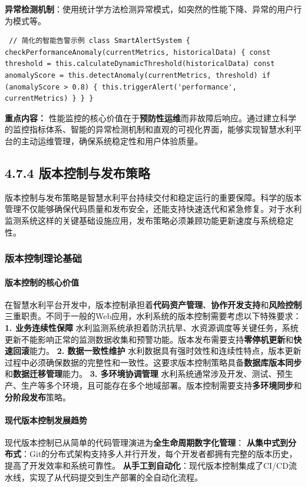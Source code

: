 \textbf{异常检测机制}：使用统计学方法检测异常模式，如突然的性能下降、异常的用户行为模式等。 \begin{verbatim} // 简化的智能告警示例 class SmartAlertSystem { checkPerformanceAnomaly(currentMetrics, historicalData) { const threshold = this.calculateDynamicThreshold(historicalData) const anomalyScore = this.detectAnomaly(currentMetrics, threshold) if (anomalyScore > 0.8) { this.triggerAlert('performance', currentMetrics) } } } \end{verbatim} \textbf{重点内容：} 性能监控的核心价值在于\textbf{预防性运维}而非故障后响应。通过建立科学的监控指标体系、智能的异常检测机制和直观的可视化界面，能够实现智慧水利平台的主动运维管理，确保系统稳定性和用户体验质量。 \subsection{4.7.4 版本控制与发布策略}\label{ux7248ux672cux63a7ux5236ux4e0eux53d1ux5e03ux7b56ux7565} 版本控制与发布策略是智慧水利平台持续交付和稳定运行的重要保障。科学的版本管理不仅能够确保代码质量和发布安全，还能支持快速迭代和紧急修复。对于水利监测系统这样的关键基础设施应用，发布策略必须兼顾功能更新速度与系统稳定性。 \subsubsection{版本控制理论基础}\label{ux7248ux672cux63a7ux5236ux7406ux8bbaux57faux7840} \paragraph{版本控制的核心价值}\label{ux7248ux672cux63a7ux5236ux7684ux6838ux5fc3ux4ef7ux503c} 在智慧水利平台开发中，版本控制承担着\textbf{代码资产管理}、\textbf{协作开发支持}和\textbf{风险控制}三重职责。不同于一般的Web应用，水利系统的版本控制需要考虑以下特殊要求： \textbf{1. 业务连续性保障} 水利监测系统承担着防汛抗旱、水资源调度等关键任务，系统更新不能影响正常的监测数据收集和预警功能。版本发布需要支持\textbf{零停机更新}和\textbf{快速回滚}能力。 \textbf{2. 数据一致性维护} 水利数据具有强时效性和连续性特点，版本更新过程中必须确保数据的完整性和一致性。这要求版本控制策略具备\textbf{数据库版本同步}和\textbf{数据迁移管理}能力。 \textbf{3. 多环境协调管理} 水利系统通常涉及开发、测试、预生产、生产等多个环境，且可能存在多个地域部署。版本控制需要支持\textbf{多环境同步}和\textbf{分阶段发布}策略。 \paragraph{现代版本控制发展趋势}\label{ux73b0ux4ee3ux7248ux672cux63a7ux5236ux53d1ux5c55ux8d8bux52bf} 现代版本控制已从简单的代码管理演进为\textbf{全生命周期数字化管理}： \textbf{从集中式到分布式}：Git的分布式架构支持多人并行开发，每个开发者都拥有完整的版本历史，提高了开发效率和系统可靠性。 \textbf{从手工到自动化}：现代版本控制集成了CI/CD流水线，实现了从代码提交到生产部署的全自动化流程。 
